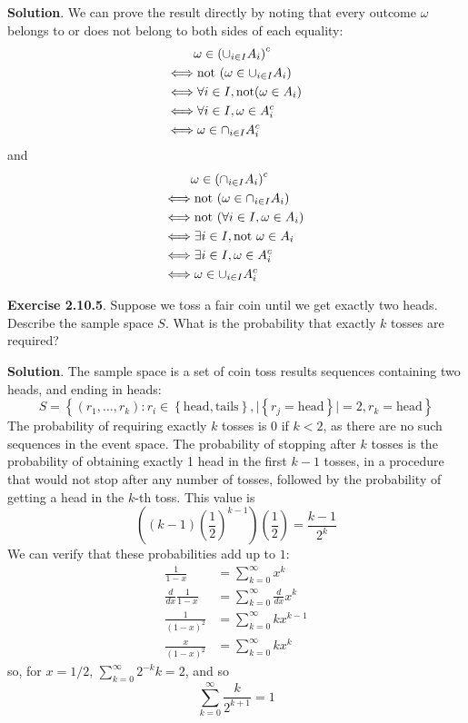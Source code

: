 \textbf{Solution}.
We can prove the result directly by noting that every outcome \(\omega\) belongs to or does not belong to both sides of each equality:
\begin{align*}
& \omega \in \left( \union_{i \in I} A_{i} \right)^{c} 
\\
\Longleftrightarrow
& \; \text{not }\left( \omega \in \union_{i \in I} A_{i}  \right) 
\\
\Longleftrightarrow
& \; \forall i \in I, \text{not} \left( \omega \in A_{i} \right) 
\\
\Longleftrightarrow
& \; \forall i \in I, \omega \in A_{i}^{c} 
\\
\Longleftrightarrow
& \; \omega \in \inter_{i \in I} A_{i}^{c}
\end{align*}
and
\begin{align*}
& \omega \in \left( \inter_{i \in I} A_{i} \right)^{c}  \\
\Longleftrightarrow
&\; \text{not }\left( \omega \in \inter_{i \in I} A_{i}  \right) 
\\
\Longleftrightarrow
&\; \text{not } \left( \forall i \in I, \omega \in A_{i} \right) 
\\
\Longleftrightarrow
&\; \exists i \in I, \text{not } \omega \in A_{i} 
\\
\Longleftrightarrow
&\; \exists i \in I, \omega \in A_{i}^{c} 
\\
\Longleftrightarrow
&\; \omega \in \union_{i \in I} A_{i}^{c} 
\end{align*}

\textbf{Exercise 2.10.5}. Suppose we toss a fair coin until we get exactly two heads. Describe the sample space \(S\). What is the probability that exactly \(k\) tosses are required?

\textbf{Solution}. The sample space is a set of coin toss results sequences containing two heads, and ending in heads:
\[
S = \left\{ (r_{1}, \dots, r_{k}) : r_{i} \in \left\{ \text{head}, \text{tails} \right\} , 
\Big| \left\{ r_{j} = \text{head} \right\} \Big|= 2, r_{k} = \text{head} \right\} 
\]
The probability of requiring exactly \(k\) tosses is 0 if \(k < 2\), as there are no such sequences in the event space.
The probability of stopping after \(k\) tosses is the probability of obtaining exactly 1 head in the first \(k - 1\) tosses, in a procedure that would not stop after any number of tosses, followed by the probability of getting a head in the \(k\)-th toss. This value is
\[
\left((k-1) \left(\frac{1}{2}\right)^{k - 1} \right) \left(\frac{1}{2}\right) 
= \frac{k - 1}{2^{k}}
\]
We can verify that these probabilities add up to $1$:
\begin{align*}
\frac{1}{1 - x} 
&= \sum_{k = 0}^{\infty} x^{k} 
\\
\frac{d}{dx} \frac{1}{1 - x} 
&= \sum_{k = 0}^{\infty} \frac{d}{dx} x^{k} 
\\
\frac{1}{(1 - x)^{2}} 
&= \sum_{k = 0}^{\infty} k x^{k - 1} 
\\
\frac{x}{(1 - x)^{2}} 
&= \sum_{k = 0}^{\infty} k x^{k} 
\end{align*}
so, for \(x = 1/2\), \(\sum_{k = 0}^{\infty} 2^{-k} k = 2\), and so
\[
\sum_{k = 0}^{\infty} \frac{k}{2^{k + 1}} = 1 
\]

